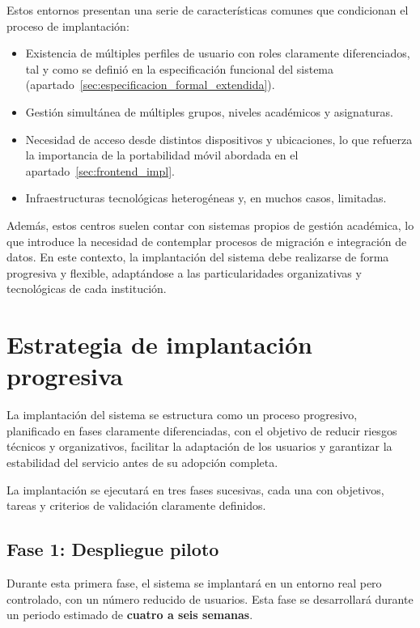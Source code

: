 Estos entornos presentan una serie de características comunes que condicionan el proceso de implantación:

\begin{itemize}
    \item Existencia de múltiples perfiles de usuario con roles claramente diferenciados, tal y como se definió en la especificación funcional del sistema (apartado~\ref{sec:especificacion_formal_extendida}).
    \item Gestión simultánea de múltiples grupos, niveles académicos y asignaturas.
    \item Necesidad de acceso desde distintos dispositivos y ubicaciones, lo que refuerza la importancia de la portabilidad móvil abordada en el apartado~\ref{sec:frontend_impl}.
    \item Infraestructuras tecnológicas heterogéneas y, en muchos casos, limitadas.
\end{itemize}

Además, estos centros suelen contar con sistemas propios de gestión académica, lo que introduce la necesidad de contemplar procesos de migración e integración de datos. En este contexto, la implantación del sistema debe realizarse de forma progresiva y flexible, adaptándose a las particularidades organizativas y tecnológicas de cada institución.


\section{Estrategia de implantación progresiva}
\label{sec:estrategia_implantacion}

La implantación del sistema se estructura como un proceso progresivo, planificado en fases claramente diferenciadas, con el objetivo de reducir riesgos técnicos y organizativos, facilitar la adaptación de los usuarios y garantizar la estabilidad del servicio antes de su adopción completa.

La implantación se ejecutará en tres fases sucesivas, cada una con objetivos, tareas y criterios de validación claramente definidos.

\subsection{Fase 1: Despliegue piloto}

Durante esta primera fase, el sistema se implantará en un entorno real pero controlado, con un número reducido de usuarios. Esta fase se desarrollará durante un periodo estimado de \textbf{cuatro a seis semanas}.

